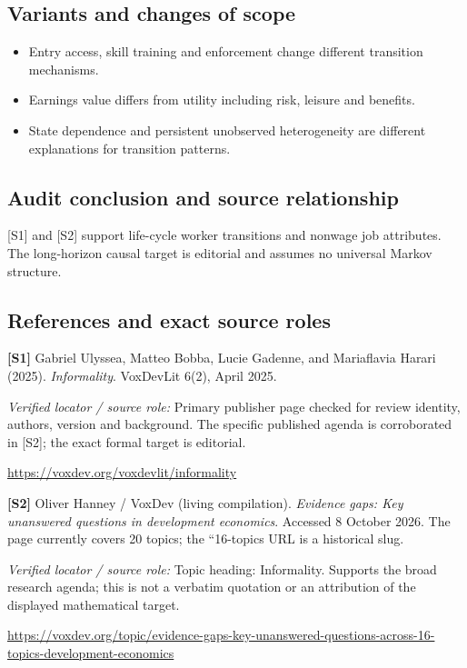 \documentclass[11pt,a4paper]{article}
\begin{document}
\subsection*{Variants and changes of scope}

\begin{itemize}
\item Entry access, skill training and enforcement change different transition mechanisms.
\item Earnings value differs from utility including risk, leisure and benefits.
\item State dependence and persistent unobserved heterogeneity are different explanations for transition patterns.
\end{itemize}

\subsection*{Audit conclusion and source relationship}

[S1] and [S2] support life-cycle worker transitions and nonwage job attributes. The long-horizon causal target is editorial and assumes no universal Markov structure.

\subsection*{References and exact source roles}

{\footnotesize\raggedright
\par\noindent\textbf{[S1]} Gabriel Ulyssea, Matteo Bobba, Lucie Gadenne, and Mariaflavia Harari (2025). \emph{Informality}. VoxDevLit 6(2), April 2025.\par \textit{Verified locator / source role:} Primary publisher page checked for review identity, authors, version and background. The specific published agenda is corroborated in [S2]; the exact formal target is editorial.\par \url{https://voxdev.org/voxdevlit/informality}\par\smallskip
\par\noindent\textbf{[S2]} Oliver Hanney / VoxDev (living compilation). \emph{Evidence gaps: Key unanswered questions in development economics}. Accessed 8 October 2026. The page currently covers 20 topics; the ``16-topics URL is a historical slug.\par \textit{Verified locator / source role:} Topic heading: Informality. Supports the broad research agenda; this is not a verbatim quotation or an attribution of the displayed mathematical target.\par \url{https://voxdev.org/topic/evidence-gaps-key-unanswered-questions-across-16-topics-development-economics}\par\smallskip
}
\end{document}
